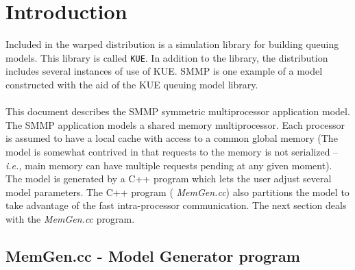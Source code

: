 \documentclass[11pt]{report}
\begin{document}
\chapter{Introduction}
Included in the {\sc warped} distribution is a simulation library for
building queuing models. This library is called \texttt{KUE}. In addition
to the library, the distribution includes several instances of use of
KUE. SMMP is one example of a model constructed with the aid of the KUE
queuing model library.
\\
\\
This document describes the SMMP symmetric multiprocessor application
model. The SMMP application models a shared memory multiprocessor. Each
processor is assumed to have a local cache with access to a common global
memory (The model is somewhat contrived in that requests to the memory is
not serialized -- {\it i.e.,} main memory can have multiple requests
pending at any given moment). The model is generated by a C++ program
which lets the user adjust several model parameters. The C++ program ({\it
MemGen.cc}) also partitions the model to take advantage of the fast
intra-processor communication. The next section deals with the {\it
MemGen.cc} program.

\section{MemGen.cc - Model Generator program}
\end{document}
